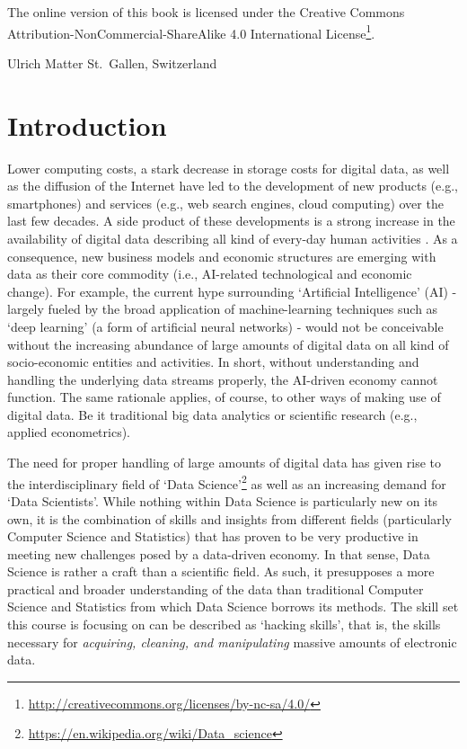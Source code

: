 \documentclass[
  12pt,
]{style/krantz}
\renewcommand{\href}[2]{#2\footnote{\url{#1}}}
\begin{document}
The online version of this book is licensed under the \href{http://creativecommons.org/licenses/by-nc-sa/4.0/}{Creative Commons Attribution-NonCommercial-ShareAlike 4.0 International License}.

\begin{flushright}
Ulrich Matter
St.~Gallen, Switzerland
\end{flushright}

\mainmatter

\hypertarget{introduction}{%
\chapter{Introduction}\label{introduction}}

Lower computing costs, a stark decrease in storage costs for digital data, as well as the diffusion of the Internet have led to the development of new products (e.g., smartphones) and services (e.g., web search engines, cloud computing) over the last few decades. A side product of these developments is a strong increase in the availability of digital data describing all kind of every-day human activities \citep{einav_levin2014, matter_stutzer2015}. As a consequence, new business models and economic structures are emerging with data as their core commodity (i.e., AI-related technological and economic change). For example, the current hype surrounding `Artificial Intelligence' (AI) - largely fueled by the broad application of machine-learning techniques such as `deep learning' (a form of artificial neural networks) - would not be conceivable without the increasing abundance of large amounts of digital data on all kind of socio-economic entities and activities. In short, without understanding and handling the underlying data streams properly, the AI-driven economy cannot function. The same rationale applies, of course, to other ways of making use of digital data. Be it traditional big data analytics or scientific research (e.g., applied econometrics).

The need for proper handling of large amounts of digital data has given rise to the interdisciplinary field of \href{https://en.wikipedia.org/wiki/Data_science}{`Data Science'} as well as an increasing demand for `Data Scientists'. While nothing within Data Science is particularly new on its own, it is the combination of skills and insights from different fields (particularly Computer Science and Statistics) that has proven to be very productive in meeting new challenges posed by a data-driven economy. In that sense, Data Science is rather a craft than a scientific field. As such, it presupposes a more practical and broader understanding of the data than traditional Computer Science and Statistics from which Data Science borrows its methods. The skill set this course is focusing on can be described as `hacking skills', that is, the skills necessary for \emph{acquiring, cleaning, and manipulating} massive amounts of electronic data.
\end{document}
